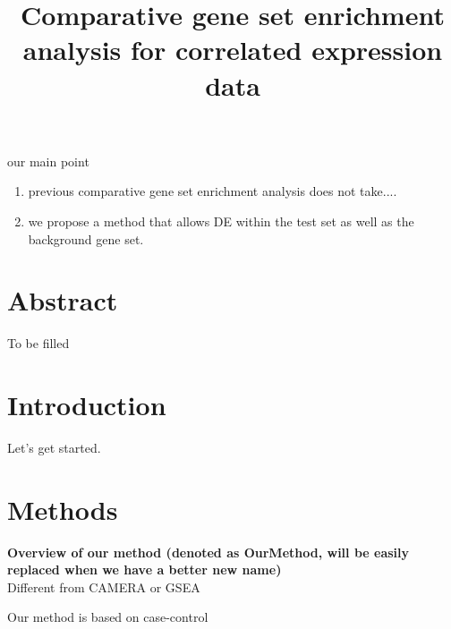 \documentclass[11pt, a4paper]{article}
\title{Comparative gene set enrichment analysis for correlated expression data}
\date{} %
\begin{document}
our main point
\begin{enumerate}
	\item previous comparative gene set enrichment analysis does not take....
	\item we propose a method that allows DE within the test set as well as the background gene set.
\end{enumerate}


\newpage
\maketitle

\section*{Abstract}
To be filled

\section{Introduction}\label{section:introduction}
Let's get started.



\section{Methods}\label{section:methods}
\textbf{Overview of our method (denoted as OurMethod, will be easily replaced when we have a better new name)} \\
Different from CAMERA\cite{wu2012camera} or GSEA \citep{subramanian2005gene}

Our method is based on case-control
\end{document}

